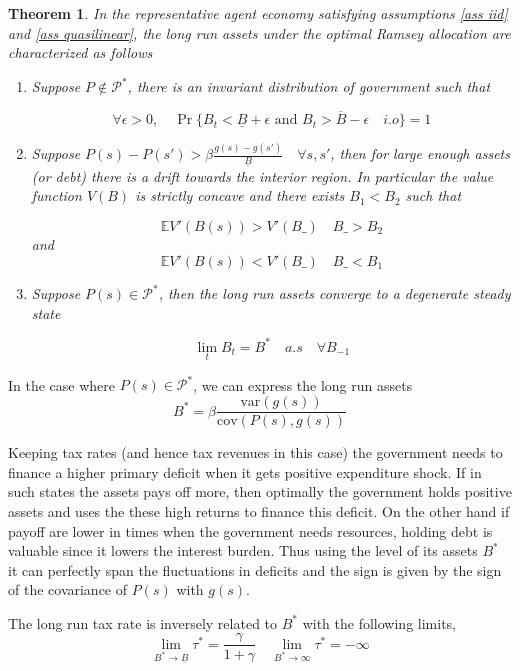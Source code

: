 \documentclass[11.5pt,twoside]{article}
\newtheorem{theorem}{Theorem}
\newcommand{\var}{\mathrm{var}}
\newcommand{\cov}{\mathrm{cov}}
\begin{document}
\begin{theorem}
\label{thm: rep agent general theorem}
In the representative agent economy satisfying assumptions \ref{ass iid} and \ref{ass quasilinear},  the long run assets under the optimal Ramsey allocation are characterized as follows
\begin{enumerate}
 \item Suppose $P\not \in \mathcal{P}^*$, there is an invariant distribution of government such that 

\[\forall \epsilon>0, \quad \Pr\{B_t<\underline{B}+\epsilon \text{ and } B_t>\overline{B}-\epsilon \quad i.o \}=1\]

\item Suppose  $P(s)-P(s')>\beta \frac{g(s)-g(s')}{\underline{B}} \quad \forall s,s'$, then for large enough assets (or debt) there is a drift towards the interior region.  In particular the value function $V(B)$ is strictly concave and there exists $B_1<B_2$ such that

\[\mathbb{E}V'(B(s))>V'(B\_) \quad B\_>B_2 \]
and
\[\mathbb{E}V'(B(s))<V'(B\_) \quad B\_<B_1 \]
\item Suppose $P(s)\in \mathcal{P}^*$, then the  long run assets converge to a degenerate steady state

\[\lim_tB_t=  B^*\quad a.s \quad \forall B_{-1} \]

\end{enumerate}


\end{theorem}
In the case where $P(s)\in\mathcal{P}^*$, we can express the long run assets \[B^*=\beta \frac{\var(g(s))}{\cov(P(s),g(s))}\]

Keeping tax rates (and hence tax revenues in this case) the government needs to finance a higher primary deficit when it gets positive expenditure shock. If in such states the assets pays off more, then optimally the government holds positive assets and uses the these high returns to finance this deficit. On the other hand if payoff are lower in times when the government needs resources, holding debt is valuable since it lowers the interest burden. Thus using the level of its assets $B^*$ it can perfectly span the fluctuations in deficits and the sign is given by the sign of the covariance of $P(s)$ with $g(s)$. 

The long run tax rate is inversely related to $B^*$ with the following limits,\[\lim_{B^*\to\underline{B}}\tau^*=\frac{\gamma}{1+\gamma}\quad \lim_{B^*\to\infty}\tau^*=-\infty\] 
\end{document}
